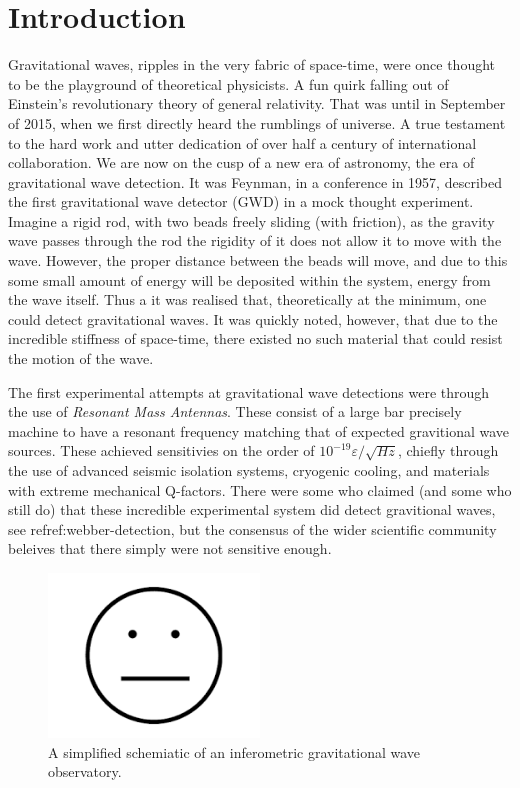 \documentclass[aps,  
                a4paper, 
                amsmath, 
                amssymb, 
                preprint,
                tightenlines,  
                amsfonts,
                nofootinbib,
                onecolumn,
                titlepage,
                10pt
            ]{revtex4-2}
\begin{document}
\tableofcontents

\section{Introduction}
    \par
    Gravitational waves, ripples in the very fabric of space-time, were once thought to be the playground of theoretical physicists. A fun quirk falling out of Einstein's revolutionary theory of general relativity. That was until in September of 2015, when we first directly heard the rumblings of universe. A true testament to the hard work and utter dedication of over half a century of international collaboration. We are now on the cusp of a new era of astronomy, the era of gravitational wave detection. It was Feynman, in a conference in 1957, described the first gravitational wave detector (GWD) in a mock thought experiment. Imagine a rigid rod, with two beads freely sliding (with friction), as the gravity wave passes through the rod the rigidity of it does not allow it to move with the wave. However, the proper distance between the beads will move, and due to this some small amount of energy will be deposited within the system, energy from the wave itself. Thus a it was realised that, theoretically at the minimum, one could detect gravitational waves. It was quickly noted, however, that due to the incredible stiffness of space-time, there existed no such material that could resist the motion of the wave.
    \par
    The first experimental attempts at gravitational wave detections were through the use of \textit{Resonant Mass Antennas}. These consist of a large bar precisely machine to have a resonant frequency matching that of expected gravitional wave sources. These achieved sensitivies on the order of $10^{-19}\varepsilon/\sqrt{Hz}$, chiefly through the use of advanced seismic isolation systems, cryogenic cooling, and materials with extreme mechanical Q-factors. There were some who claimed (and some who still do) that these incredible experimental system did detect gravitional waves, see ref{ref:webber-detection}, but the consensus of the wider scientific community beleives that there simply were not sensitive enough.
    \begin{figure}[h]
        \centering
        \includegraphics[width=0.5\textwidth]{img/blank.png}
        \caption{A simplified schemiatic of an inferometric gravitational wave observatory.}
        \label{fig:resonant_bar}
    \end{figure}
\end{document}
